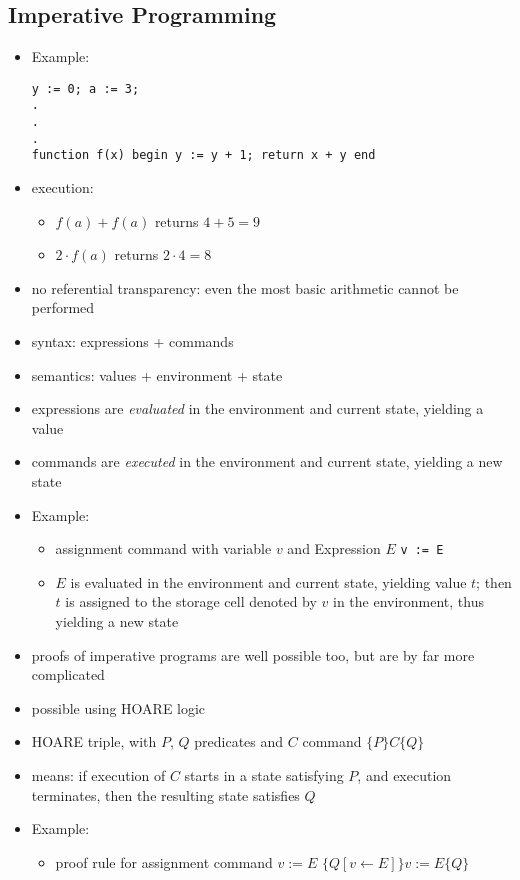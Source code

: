 \begin{multicols}{2}
\subsection{Imperative Programming}
\begin{itemize}
  \item Example:
\begin{lstlisting}
y := 0; a := 3;
.
.
.
function f(x) begin y := y + 1; return x + y end
\end{lstlisting}
  \item execution:
  \begin{itemize}
    \item $f(a) + f(a)$ returns $4 + 5 = 9$
    \item $2 \cdot f(a)$ returns $2 \cdot 4 = 8$
  \end{itemize}
  \item no referential transparency: even the most basic arithmetic cannot be performed
  \item syntax: expressions + commands
  \item semantics: values + environment + state
  \item expressions are \textit{evaluated} in the environment and current state, yielding a value
  \item commands are \textit{executed} in the environment and current state, yielding a new state
  \item Example:
  \begin{itemize}
    \item assignment command with variable $v$ and Expression $E$
    \lstinline{v := E}
    \item $E$ is evaluated in the environment and current state, yielding value $t$; then $t$ is assigned to the storage cell denoted by $v$ in the environment, thus yielding a new state
  \end{itemize}
  \item proofs of imperative programs are well possible too, but are by far more complicated
  \item possible using HOARE logic
  \item HOARE triple, with $P$, $Q$ predicates and $C$ command
  $\{P\} C \{Q\}$
  \item means: if execution of $C$ starts in a state satisfying $P$, and execution terminates, then the resulting state satisfies $Q$
  \item Example:
  \begin{itemize}
    \item proof rule for assignment command $v := E$
    $\{Q[v \leftarrow E]\} v := E\{Q\}$
  \end{itemize}
\end{itemize}


\end{multicols}
